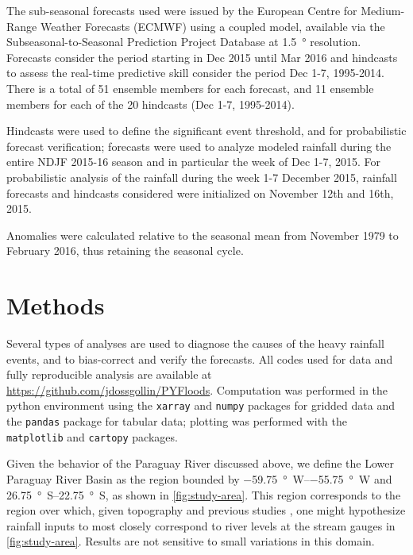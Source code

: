 \documentclass{ametsoc}
\begin{document}
The sub-seasonal forecasts used were issued by the European Centre for Medium-Range Weather Forecasts (ECMWF) using a coupled model, available via the Subseasonal-to-Seasonal Prediction Project Database \citep{Vitart2016} at \SI{1.5}{\degree} resolution.
Forecasts consider the period starting in Dec 2015 until Mar 2016 and hindcasts to assess the real-time predictive skill consider the period Dec 1-7, 1995-2014.
There is a total of 51 ensemble members for each forecast, and 11 ensemble members for each of the 20 hindcasts (Dec 1-7, 1995-2014).

Hindcasts were used to define the significant event threshold, and for probabilistic forecast verification; forecasts were used to analyze modeled rainfall during the entire NDJF 2015-16 season and in particular the week of Dec 1-7, 2015.
For probabilistic analysis of the rainfall during the week 1-7 December 2015, rainfall forecasts and hindcasts considered were initialized on November 12th and 16th, 2015.

Anomalies were calculated relative to the seasonal mean from November 1979 to February 2016, thus retaining the seasonal cycle.


\section{Methods} \label{sec:methods}

Several types of analyses are used to diagnose the causes of the heavy rainfall events, and to bias-correct and verify the forecasts.
All codes used for data and fully reproducible analysis are available at \url{https://github.com/jdossgollin/PYFloods}.
Computation was performed in the python environment using the \texttt{xarray} \citep{hoyer2017xarray} and \texttt{numpy} \citep{vanderWalt:2011dp} packages for gridded data and the \texttt{pandas} \citep{McKinney:2010un} package for tabular data; plotting was performed with the \texttt{matplotlib} \citep{Hunter:2007ux} and \texttt{cartopy} \citep{Cartopy} packages.

Given the behavior of the Paraguay River discussed above, we define the Lower Paraguay River Basin as the region bounded by \SIrange{-59.75}{-55.75}{\degree W} and \SIrange{26.75}{22.75}{\degree S}, as shown in \cref{fig:study-area}.
This region corresponds to the region over which, given topography and previous studies \citep{Barros:2004bn,Bravo:2011et}, one might hypothesize rainfall inputs to most closely correspond to river levels at the stream gauges in \cref{fig:study-area}.
Results are not sensitive to small variations in this domain.
\end{document}
